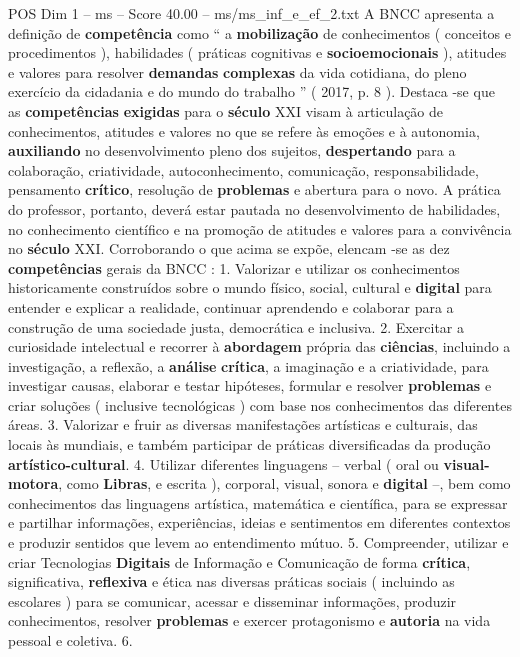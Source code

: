 \begin{textsample}{POS Dim 1 – ms – Score 40.00 – ms/ms\_inf\_e\_ef\_2.txt}
A BNCC apresenta a definição de \textbf{competência} como “ a \textbf{mobilização} de conhecimentos ( conceitos e procedimentos ), habilidades ( práticas cognitivas e \textbf{socioemocionais} ), atitudes e valores para resolver \textbf{demandas} \textbf{complexas} da vida cotidiana, do pleno exercício da cidadania e do mundo do trabalho ” ( 2017, p. 8 ).
Destaca -se que as \textbf{competências} \textbf{exigidas} para o \textbf{século} XXI visam à articulação de conhecimentos, atitudes e valores no que se refere às emoções e à autonomia, \textbf{auxiliando} no desenvolvimento pleno dos sujeitos, \textbf{despertando} para a colaboração, criatividade, autoconhecimento, comunicação, responsabilidade, pensamento \textbf{crítico}, resolução de \textbf{problemas} e abertura para o novo.
A prática do professor, portanto, deverá estar pautada no desenvolvimento de habilidades, no conhecimento científico e na promoção de atitudes e valores para a convivência no \textbf{século} XXI.
Corroborando o que acima se expõe, elencam -se as dez \textbf{competências} gerais da BNCC : 1.
Valorizar e utilizar os conhecimentos historicamente construídos sobre o mundo físico, social, cultural e \textbf{digital} para entender e explicar a realidade, continuar aprendendo e colaborar para a construção de uma sociedade justa, democrática e inclusiva. 2.
Exercitar a curiosidade intelectual e recorrer à \textbf{abordagem} própria das \textbf{ciências}, incluindo a investigação, a reflexão, a \textbf{análise} \textbf{crítica}, a imaginação e a criatividade, para investigar causas, elaborar e testar hipóteses, formular e resolver \textbf{problemas} e criar soluções ( inclusive tecnológicas ) com base nos conhecimentos das diferentes áreas. 3.
Valorizar e fruir as diversas manifestações artísticas e culturais, das locais às mundiais, e também participar de práticas diversificadas da produção \textbf{artístico-cultural}. 4.
Utilizar diferentes linguagens – verbal ( oral ou \textbf{visual-motora}, como \textbf{Libras}, e escrita ), corporal, visual, sonora e \textbf{digital} –, bem como conhecimentos das linguagens artística, matemática e científica, para se expressar e partilhar informações, experiências, ideias e sentimentos em diferentes contextos e produzir sentidos que levem ao entendimento mútuo. 5.
Compreender, utilizar e criar Tecnologias \textbf{Digitais} de Informação e Comunicação de forma \textbf{crítica}, significativa, \textbf{reflexiva} e ética nas diversas práticas sociais ( incluindo as escolares ) para se comunicar, acessar e disseminar informações, produzir conhecimentos, resolver \textbf{problemas} e exercer protagonismo e \textbf{autoria} na vida pessoal e coletiva. 6.

\end{textsample}
